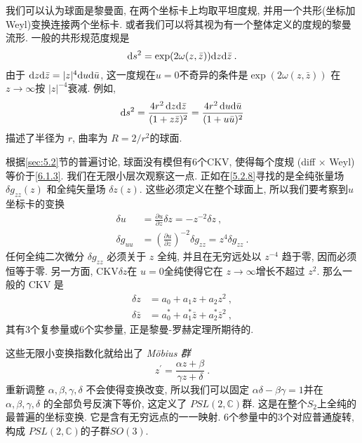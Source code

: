 我们可以认为球面是黎曼面, 在两个坐标卡上均取平坦度规, 并用一个共形(坐标加 Weyl)变换连接两个坐标卡. 
或者我们可以将其视为有一个整体定义的度规的黎曼流形. 一般的共形规范度规是
\begin{equation}
	\mathrm{d} s^{2}=\exp (2 \omega(z, \bar{z})) \mathrm{d} z \mathrm{d} \bar{z} \:. \label{6.1.2}
\end{equation}
由于 $\mathrm{d} z \mathrm{d} \bar{z}=|z|^{4} \mathrm{d} u \mathrm{d} \bar{u}$, 这一度规在$u=0$不奇异的条件是$\exp (2 \omega(z, \bar{z}))$ 在 $z \to \infty $按 $|z|^{-4}$衰减. 例如,
\begin{equation}
	\mathrm{d} s^{2}=\frac{4 r^{2}\, \mathrm{d} z \mathrm{d} \bar{z}}{(1+z \bar{z})^{2}}=\frac{4 r^{2}\, \mathrm{d} u \mathrm{d} \bar{u}}{(1+u \bar{u})^{2}} \label{6.1.3}
\end{equation}
描述了半径为 $r$, 曲率为 $R=2 / r^{2}$的球面.

根据\ref{sec:5.2}节的普遍讨论, 球面没有模但有6个CKV, 使得每个度规 (diff $\times$ Weyl)等价于\eqref{6.1.3}. 
我们在无限小层次观察这一点. 正如在\eqref{5.2.8}寻找的是全纯张量场$\delta g_{z z}(z)$ 和全纯矢量场 $\delta z(z)$. 
这些必须定义在整个球面上, 所以我们要考察到$u$坐标卡的变换
\begin{subequations}  \label{6.1.4}
	\begin{align}
		\delta u &=\frac{\partial u}{\partial z} \delta z=-z^{-2} \delta z \:, \label{6.1.4a} \\
		\delta g_{u u} &=\left(\frac{\partial u}{\partial z}\right)^{-2} \delta g_{z z}=z^{4} \delta g_{z z} \:. \label{6.1.4b} 
	\end{align}
\end{subequations}
任何全纯二次微分 $\delta g_{z z}$ 必须关于 $z$ 全纯, 并且在无穷远处以 $z^{-4}$ 趋于零, 因而必须恒等于零. 
另一方面, $\mathrm{CKV} \delta z$在 $u=0$全纯使得它在 $z \rightarrow \infty$增长不超过 $z^{2}$. 那么一般的 $\mathrm{CKV}$ 是
\begin{subequations} \label{6.1.5}
	\begin{align}
		\delta z       &= a_{0}+a_{1} z+a_{2} z^{2}  \:, \label{6.1.5a} \\
		\delta \bar{z} &= a_{0}^{*}+a_{1}^{*} \bar{z}+a_{2}^{*} \bar{z}^{2} \:, \label{6.1.5b}
	\end{align}
\end{subequations}
其有3个复参量或6个实参量, 正是黎曼-罗赫定理所期待的.


这些无限小变换指数化就给出了 \emph{M\"{o}bius 群}
\begin{equation}
	z^{\prime}=\frac{\alpha z+\beta}{\gamma z+\delta} \:. \label{6.1.6}
\end{equation}
重新调整 $\alpha, \beta, \gamma, \delta $ 不会使得变换改变, 所以我们可以固定 $\alpha \delta-\beta \gamma=1$并在 $\alpha, \beta, \gamma, \delta $ 的全部负号反演下等价, 这定义了 $P S L(2, \mathds{C})$群. 这是在整个$S_{2}$上全纯的最普遍的坐标变换. 它是含有无穷远点的一一映射. 
6个参量中的3个对应普通旋转, 构成 $PSL(2, \mathds{C})$的子群$SO(3)$. 

